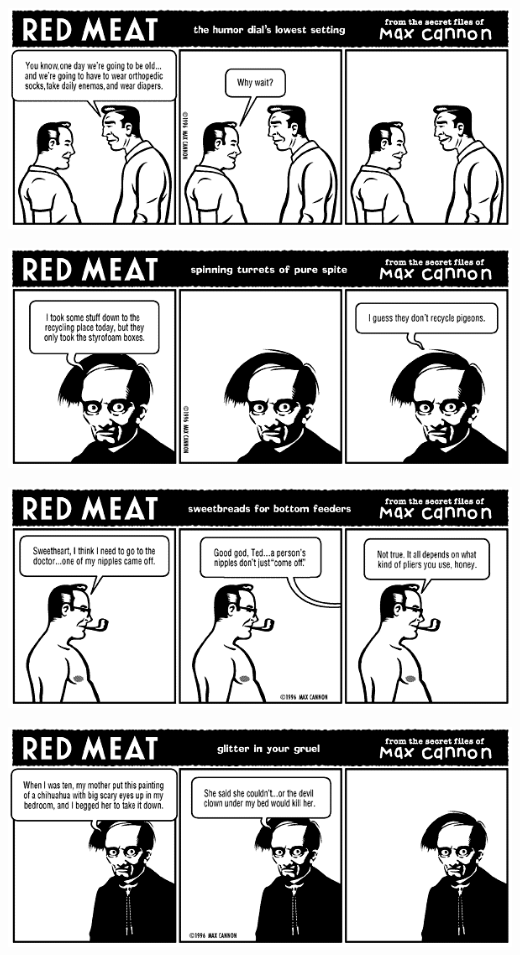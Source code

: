 \documentclass[a4paper,twoside,11pt]{article}
\begin{document}
\includegraphics[width=\textwidth]{redmeat_1996-12-23.png}



\includegraphics[width=\textwidth]{redmeat_1996-12-30.png}



\includegraphics[width=\textwidth]{redmeat_1997-01-06.png}



\includegraphics[width=\textwidth]{redmeat_1997-01-13.png}
\end{document}

